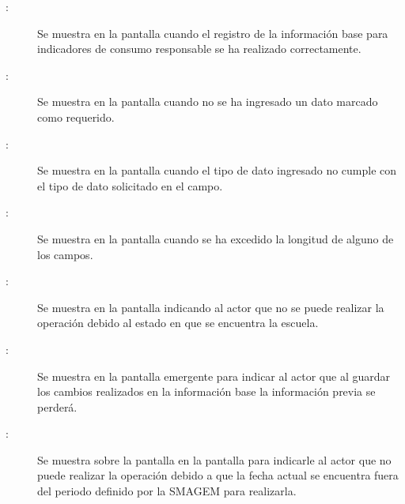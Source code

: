     \begin{description}
      
	    \item [:] Se muestra en la pantalla  cuando el registro de la información base para indicadores de consumo responsable se ha realizado correctamente.
	    
	    \item [:] Se muestra en la pantalla  cuando no se ha ingresado un dato marcado como requerido.
	    
	    \item [:] Se muestra en la pantalla  cuando el tipo de dato ingresado no cumple con el tipo de dato solicitado en el campo.
	    
	    \item [:] Se muestra en la pantalla  cuando se ha excedido la longitud de alguno de los campos.	    
	      
	    \item[:] Se muestra en la pantalla  indicando al actor que no se puede realizar la operación debido al estado en que se encuentra la escuela.
	    
	    \item [:] Se muestra en la pantalla emergente  para indicar al actor que al guardar los cambios realizados en la información base la información previa se perderá.  
	    
	    \item [:] Se muestra sobre la pantalla en la pantalla  para indicarle al actor que no puede realizar la operación debido a que la fecha actual se encuentra fuera del periodo definido por la SMAGEM para realizarla.
	    
    \end{description}
